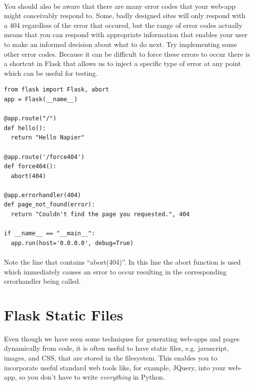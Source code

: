 \documentclass[12pt, a4paper, oneside]{book}
\begin{document}
\paragraph{} You should also be aware that there are many error codes that your web-app might conceivably respond to. Some, badly designed sites will only respond with a 404 regardless of the error that occured, but the range of error codes actually means that you can respond with appropriate information that enables your user to make an informed decision about what to do next. Try implementing some other error codes. Because it can be difficult to force these errors to occur there is a shortcut in Flask that allows us to inject a specific type of error at any point which can be useful for testing.

\begin{lstlisting}
from flask import Flask, abort
app = Flask(__name__)

@app.route("/")
def hello():
  return "Hello Napier"

@app.route('/force404')
def force404():
  abort(404)

@app.errorhandler(404)
def page_not_found(error):
  return "Couldn't find the page you requested.", 404

if __name__ == "__main__":
  app.run(host='0.0.0.0', debug=True)
\end{lstlisting}

\paragraph{} Note the line that contains ``abort(404)''. In this line the abort function is used which immediately causes an error to occur resulting in the corresponding errorhandler being called.

\section{Flask Static Files}
\label{static}
\paragraph{} Even though we have seen some techniques for generating web-apps and pages dynamically from code, it is often useful to have static files, e.g. javascript, images, and CSS, that are stored in the filesystem. This enables you to incorporate useful standard web tools like, for example, JQuery, into your web-app, so you don't have to write \emph{everything} in Python.
\end{document}
